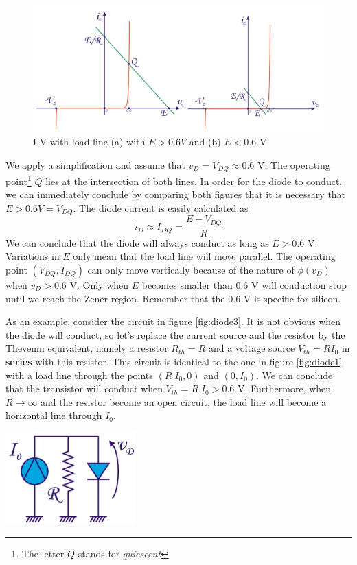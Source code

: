 \begin{figure}[h!]
	\centering
	\includegraphics[width=12cm]{figures/ch02/diode2.jpg}
	\caption{I-V with load line (a) with $E > 0.6 V$ and (b) $E < 0.6$ V}
	\label{fig:diode2}
\end{figure}
We apply a simplification and assume that $v_D = V_{DQ} \approx 0.6$ V. The operating point\footnote{The letter $Q$ stands for \emph{quiescent}} $Q$ lies at the intersection of both lines. In order for the diode to conduct, we can immediately conclude by comparing both figures that it is necessary that $E > 0.6V = V_{DQ}$. The diode current is easily calculated as
$$
i_D \approx I_{DQ} = \frac{E - V_{DQ}}{R}
$$
We can conclude that the diode will always conduct as long as $E > 0.6$ V. Variations in $E$ only mean that the load line will move parallel. The operating point $(V_{DQ},  I_{DQ})$ can only move vertically because of the nature of $\phi(v_D)$ when $v_D > 0.6$ V. Only when $E$ becomes smaller than $0.6$ V will conduction stop until we reach the Zener region. Remember that the $0.6$ V is specific for silicon.\\

\begin{minipage}{.6\textwidth}
	As an example, consider the circuit in figure \ref{fig:diode3}. It is not obvious when the diode will conduct, so let's replace the current source and the resistor by the Thevenin equivalent, namely a resistor $R_{th} = R$ and a voltage source $V_{th} = R I_0$ in \textbf{series} with this resistor. This circuit is identical to the one in figure \ref{fig:diode1} with a load line through the points $(R\;I_0, 0)$ and $(0, I_0)$. We can conclude that the transistor will conduct when $V_{th} = R\;I_0 > 0.6$ V. Furthermore, when $R\rightarrow \infty$ and the resistor become an open circuit, the load line will become a horizontal line through $I_0$.
\end{minipage}
\begin{minipage}{.5\textwidth}
	\centering
	\includegraphics[width=5cm]{figures/ch02/diode3.jpg}
	\label{fig:diode3}
\end{minipage}%

